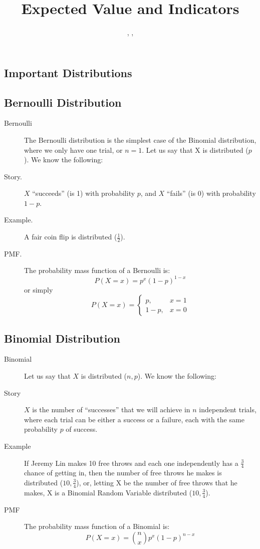 \documentclass[11pt]{article}
\title{Expected Value and Indicators}
\author{\shira, \tim, \creds}
\begin{document}
\maketitle

\begin{notes}

\section*{Important Distributions}

\subsection*{Bernoulli Distribution}
\begin{description}
    \item[Bernoulli] The Bernoulli distribution is the simplest case of the Binomial distribution, where we only have one trial, or $n=1$. Let us say that X is distributed \Bern($p$). We know the following:
	\item[Story.] $X$ ``succeeds'' (is 1) with probability $p$, and $X$ ``fails'' (is 0) with probability $1-p$.
	\item[Example.] A fair coin flip is distributed \Bern($\frac{1}{2}$).
	\item[PMF.] The probability mass function of a Bernoulli is:
\[P(X = x) = p^x(1-p)^{1-x}\]
or simply
\[P(X = x) = \begin{cases} p, & x = 1 \\ 1-p, & x = 0 \end{cases}\]
\end{description}

\subsection*{Binomial Distribution}
\begin{description}
    \item[Binomial] Let us say that $X$ is distributed \Bin($n,p$). We know the following:
	\item[Story] $X$ is the number of ``successes'' that we will achieve in $n$ independent trials, where each trial can be either a success or a failure, each with the same probability $p$ of success.
	\item[Example] If Jeremy Lin makes 10 free throws and each one independently has a $\frac{3}{4}$ chance of getting in, then the number of free throws he makes is distributed  \Bin($10,\frac{3}{4}$), or, letting X be the number of free throws that he makes, X is a Binomial Random Variable distributed  \Bin($10,\frac{3}{4}$).
	\item[PMF] The probability mass function of a Binomial is:
\[P(X = x) = {n  \choose x} p^x(1-p)^{n-x}\]
\end{description}


\end{notes}
\end{document}
